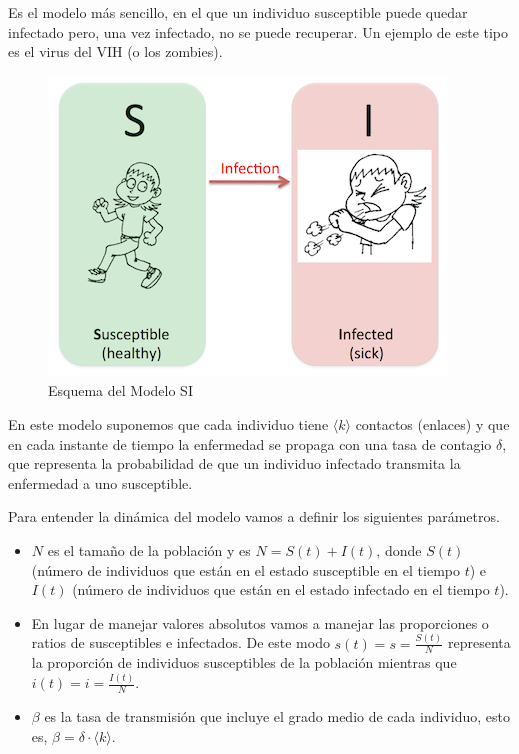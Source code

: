 \documentclass[]{article}
\begin{document}
Es el modelo más sencillo, en el que un individuo susceptible puede
quedar infectado pero, una vez infectado, no se puede recuperar. Un
ejemplo de este tipo es el virus del VIH (o los zombies).

\begin{figure}[htbp]
\centering
\includegraphics{../images/tema08/modeloSI.png}
\caption{Esquema del Modelo SI}
\end{figure}

En este modelo suponemos que cada individuo tiene \(\langle k \rangle\)
contactos (enlaces) y que en cada instante de tiempo la enfermedad se
propaga con una tasa de contagio \(\delta\), que representa la
probabilidad de que un individuo infectado transmita la enfermedad a uno
susceptible.

Para entender la dinámica del modelo vamos a definir los siguientes
parámetros.

\begin{itemize}
\itemsep1pt\parskip0pt
\item
  \(N\) es el tamaño de la población y es \(N = S(t) + I(t)\), donde
  \(S(t)\) (número de individuos que están en el estado susceptible en
  el tiempo \(t\)) e \(I(t)\) (número de individuos que están en el
  estado infectado en el tiempo \(t\)).
\item
  En lugar de manejar valores absolutos vamos a manejar las proporciones
  o ratios de susceptibles e infectados. De este modo
  \(s(t) = s = \frac{S(t)}{N}\) representa la proporción de individuos
  susceptibles de la población mientras que
  \(i(t) = i = \frac{I(t)}{N}\).
\item
  \(\beta\) es la tasa de transmisión que incluye el grado medio de cada
  individuo, esto es, \(\beta = \delta \cdot \langle k \rangle\).
\end{itemize}
\end{document}
